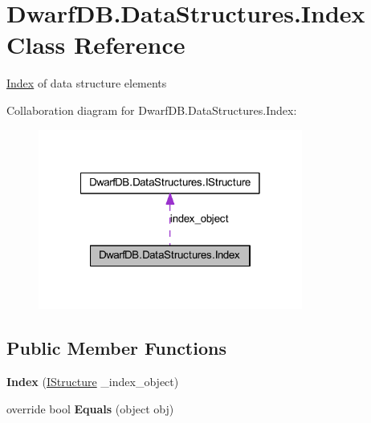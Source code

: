 \hypertarget{class_dwarf_d_b_1_1_data_structures_1_1_index}{\section{Dwarf\+D\+B.\+Data\+Structures.\+Index Class Reference}
\label{class_dwarf_d_b_1_1_data_structures_1_1_index}
}


\hyperlink{class_dwarf_d_b_1_1_data_structures_1_1_index}{Index} of data structure elements  




Collaboration diagram for Dwarf\+D\+B.\+Data\+Structures.\+Index\+:\nopagebreak
\begin{figure}[H]
\begin{center}
\leavevmode
\includegraphics[width=246pt]{class_dwarf_d_b_1_1_data_structures_1_1_index__coll__graph}
\end{center}
\end{figure}
\subsection*{Public Member Functions}
\begin{DoxyCompactItemize}
\item 
\hypertarget{class_dwarf_d_b_1_1_data_structures_1_1_index_a2481d361d4dbf7cb81f094a834b93214}{{\bfseries Index} (\hyperlink{interface_dwarf_d_b_1_1_data_structures_1_1_i_structure}{I\+Structure} \+\_\+index\+\_\+object)}\label{class_dwarf_d_b_1_1_data_structures_1_1_index_a2481d361d4dbf7cb81f094a834b93214}

\item 
\hypertarget{class_dwarf_d_b_1_1_data_structures_1_1_index_aef1cd3ec762c296c9ced22ab8ed4ab12}{override bool {\bfseries Equals} (object obj)}\label{class_dwarf_d_b_1_1_data_structures_1_1_index_aef1cd3ec762c296c9ced22ab8ed4ab12}

\end{DoxyCompactItemize}
